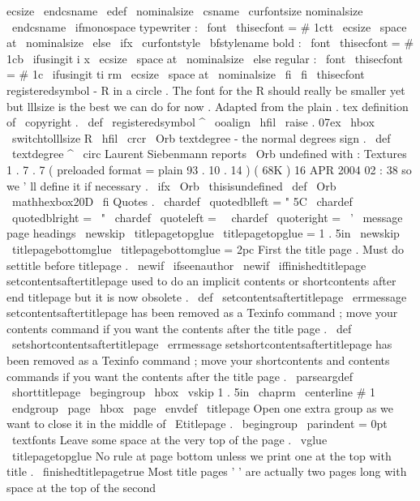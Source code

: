 {{{{{{ecsize
\
endcsname
}
%
\
edef
\
nominalsize
{
\
csname
\
curfontsize
nominalsize
\
endcsname
}
%
\
ifmonospace
%
typewriter
:
\
font
\
thisecfont
=
#
1ctt
\
ecsize
\
space
at
\
nominalsize
\
else
\
ifx
\
curfontstyle
\
bfstylename
%
bold
:
\
font
\
thisecfont
=
#
1cb
\
ifusingit
{
i
}
{
x
}
\
ecsize
\
space
at
\
nominalsize
\
else
%
regular
:
\
font
\
thisecfont
=
#
1c
\
ifusingit
{
ti
}
{
rm
}
\
ecsize
\
space
at
\
nominalsize
\
fi
\
fi
\
thisecfont
}
%
registeredsymbol
-
R
in
a
circle
.
The
font
for
the
R
should
really
%
be
smaller
yet
but
lllsize
is
the
best
we
can
do
for
now
.
%
Adapted
from
the
plain
.
tex
definition
of
\
copyright
.
%
\
def
\
registeredsymbol
{
%
^
{
{
\
ooalign
{
\
hfil
\
raise
.
07ex
\
hbox
{
\
switchtolllsize
R
}
%
\
hfil
\
crcr
\
Orb
}
}
%
}
%
}
%
textdegree
-
the
normal
degrees
sign
.
%
\
def
\
textdegree
{
^
\
circ
}
%
Laurent
Siebenmann
reports
\
Orb
undefined
with
:
%
Textures
1
.
7
.
7
(
preloaded
format
=
plain
93
.
10
.
14
)
(
68K
)
16
APR
2004
02
:
38
%
so
we
'
ll
define
it
if
necessary
.
%
\
ifx
\
Orb
\
thisisundefined
\
def
\
Orb
{
\
mathhexbox20D
}
\
fi
%
Quotes
.
\
chardef
\
quotedblleft
=
"
5C
\
chardef
\
quotedblright
=
\
"
\
chardef
\
quoteleft
=
\
\
chardef
\
quoteright
=
\
'
\
message
{
page
headings
}
\
newskip
\
titlepagetopglue
\
titlepagetopglue
=
1
.
5in
\
newskip
\
titlepagebottomglue
\
titlepagebottomglue
=
2pc
%
First
the
title
page
.
Must
do
settitle
before
titlepage
.
\
newif
\
ifseenauthor
\
newif
\
iffinishedtitlepage
%
setcontentsaftertitlepage
used
to
do
an
implicit
contents
or
%
shortcontents
after
end
titlepage
but
it
is
now
obsolete
.
\
def
\
setcontentsaftertitlepage
{
%
\
errmessage
{
setcontentsaftertitlepage
has
been
removed
as
a
Texinfo
command
;
move
your
contents
command
if
you
want
the
contents
after
the
title
page
.
}
}
%
\
def
\
setshortcontentsaftertitlepage
{
%
\
errmessage
{
setshortcontentsaftertitlepage
has
been
removed
as
a
Texinfo
command
;
move
your
shortcontents
and
contents
commands
if
you
want
the
contents
after
the
title
page
.
}
}
%
\
parseargdef
\
shorttitlepage
{
%
\
begingroup
\
hbox
{
}
\
vskip
1
.
5in
\
chaprm
\
centerline
{
#
1
}
%
\
endgroup
\
page
\
hbox
{
}
\
page
}
\
envdef
\
titlepage
{
%
%
Open
one
extra
group
as
we
want
to
close
it
in
the
middle
of
\
Etitlepage
.
\
begingroup
\
parindent
=
0pt
\
textfonts
%
Leave
some
space
at
the
very
top
of
the
page
.
\
vglue
\
titlepagetopglue
%
No
rule
at
page
bottom
unless
we
print
one
at
the
top
with
title
.
\
finishedtitlepagetrue
%
%
Most
title
pages
'
'
are
actually
two
pages
long
with
space
%
at
the
top
of
the
second
}}}}}
